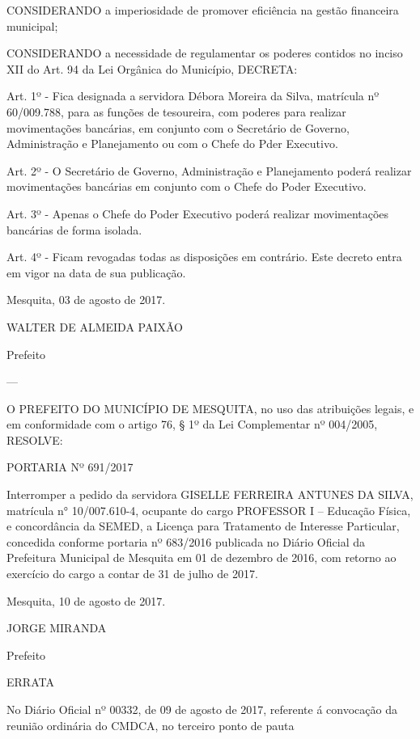 \documentclass{doliberto}
\begin{document}
CONSIDERANDO  a  imperiosidade  de  promover  eficiência 
na gestão financeira municipal; 
 
CONSIDERANDO a necessidade de regulamentar os poderes 
contidos  no  inciso  XII  do  Art.  94  da  Lei  Orgânica  do 
Município, DECRETA: 
 
Art.  1º  -  Fica  designada  a  servidora  Débora  Moreira  da 
Silva,  matrícula  nº  60/009.788,  para  as  funções  de 
tesoureira,  com  poderes  para  realizar  movimentações 
bancárias,  em  conjunto  com  o  Secretário  de  Governo, 
Administração  e  Planejamento  ou  com  o  Chefe  do  Pder 
Executivo. 
 
Art.  2º  -  O  Secretário  de  Governo,  Administração  e 
Planejamento poderá realizar movimentações bancárias em 
conjunto com o Chefe do Poder Executivo. 
 
Art. 3º - Apenas o Chefe do Poder Executivo poderá realizar 
movimentações bancárias de forma isolada. 
 
Art.  4º  -  Ficam  revogadas  todas  as  disposições  em 
contrário.  Este  decreto  entra  em  vigor  na  data  de  sua 
publicação. 

 
Mesquita, 03 de agosto de 2017. 
 

WALTER  DE ALMEIDA PAIXÃO 

Prefeito 


---

O  PREFEITO  DO  MUNICÍPIO  DE  MESQUITA,  no  uso  das 
atribuições legais, e em conformidade com o artigo 76, § 1º 
da Lei Complementar nº 004/2005, 
  RESOLVE:  
 
PORTARIA Nº 691/2017 
 
Interromper  a  pedido  da  servidora  GISELLE  FERREIRA 
ANTUNES DA SILVA, matrícula n° 10/007.610-4, ocupante 
do  cargo 
  PROFESSOR  I  –  Educação  Física,  e 
concordância da SEMED, a Licença para Tratamento de 
Interesse  Particular,  concedida  conforme  portaria  nº 
683/2016  publicada  no  Diário  Oficial  da  Prefeitura 
Municipal  de  Mesquita  em  01  de  dezembro  de  2016,  com 
retorno  ao  exercício  do  cargo  a  contar  de  31  de  julho  de 
2017. 


 
Mesquita, 10 de agosto de 2017.  

 

JORGE MIRANDA 

Prefeito 

ERRATA 
 
No  Diário  Oficial  nº  00332,  de  09  de  agosto  de  2017, 
referente á convocação da reunião ordinária do CMDCA, no 
terceiro ponto de pauta 
 
\end{document}
